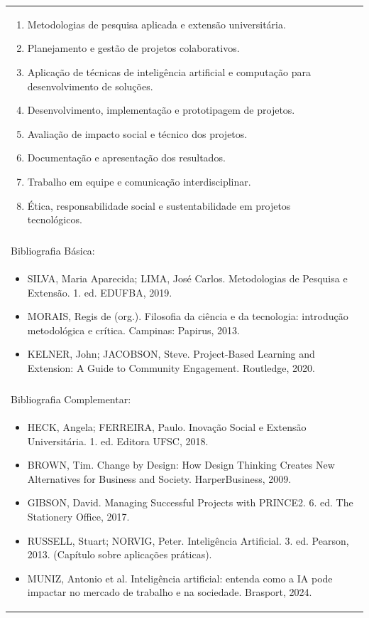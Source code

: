 \documentclass[11pt]{article}
\begin{document}
\begin{center}
\begin{longtable}{|p{4cm}|p{4cm}|p{4cm}|p{4cm}|}
{\begin{enumerate}
\item Metodologias de pesquisa aplicada e extensão universitária.
\item Planejamento e gestão de projetos colaborativos.
\item Aplicação de técnicas de inteligência artificial e computação para desenvolvimento de soluções.
\item Desenvolvimento, implementação e prototipagem de projetos.
\item Avaliação de impacto social e técnico dos projetos.
\item Documentação e apresentação dos resultados.
\item Trabalho em equipe e comunicação interdisciplinar.
\item Ética, responsabilidade social e sustentabilidade em projetos tecnológicos.\end{enumerate}}\\
\multicolumn{4}{|p{16cm}|}{}\\
\hline
\multicolumn{4}{|p{16cm}|}{Bibliografia Básica:}\\
\multicolumn{4}{|p{16cm}|}{%
\begin{itemize}\item SILVA, Maria Aparecida; LIMA, José Carlos. Metodologias de Pesquisa e Extensão. 1. ed. EDUFBA, 2019.
\item MORAIS, Regis de (org.). Filosofia da ciência e da tecnologia: introdução metodológica e crítica. Campinas: Papirus, 2013.
\item KELNER, John; JACOBSON, Steve. Project-Based Learning and Extension: A Guide to Community Engagement. Routledge, 2020.\end{itemize}}\\
\multicolumn{4}{|p{16cm}|}{}\\
\hline
\multicolumn{4}{|p{16cm}|}{Bibliografia Complementar:}\\
\multicolumn{4}{|p{16cm}|}{%
\begin{itemize}\item HECK, Angela; FERREIRA, Paulo. Inovação Social e Extensão Universitária. 1. ed. Editora UFSC, 2018.
\item BROWN, Tim. Change by Design: How Design Thinking Creates New Alternatives for Business and Society. HarperBusiness, 2009.
\item GIBSON, David. Managing Successful Projects with PRINCE2. 6. ed. The Stationery Office, 2017.
\item RUSSELL, Stuart; NORVIG, Peter. Inteligência Artificial. 3. ed. Pearson, 2013. (Capítulo sobre aplicações práticas).
\item MUNIZ, Antonio et al. Inteligência artificial: entenda como a IA pode impactar no mercado de trabalho e na sociedade. Brasport, 2024.\end{itemize}}\\
\hline
\end{longtable}
\end{center}
\end{document}
